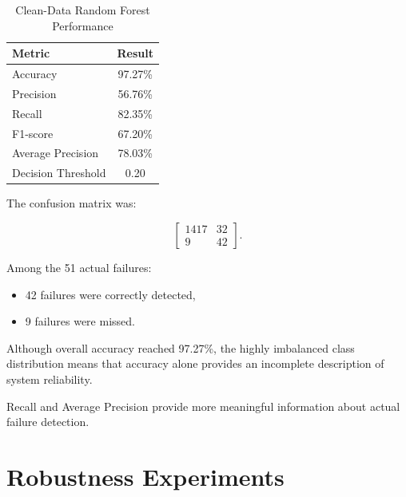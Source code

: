 \documentclass[conference]{IEEEtran}
\begin{document}
\begin{table}[htbp]

\caption{Clean-Data Random Forest Performance}

\label{tab:baseline}

\centering

\begin{tabular}{lc}

\toprule

\textbf{Metric} & \textbf{Result}\\

\midrule

Accuracy & 97.27\%\\
Precision & 56.76\%\\
Recall & 82.35\%\\
F1-score & 67.20\%\\
Average Precision & 78.03\%\\
Decision Threshold & 0.20\\

\bottomrule

\end{tabular}

\end{table}

The confusion matrix was:

\[
\begin{bmatrix}
1417 & 32\\
9 & 42
\end{bmatrix}.
\]

Among the 51 actual failures:

\begin{itemize}

    \item 42 failures were correctly detected,
    \item 9 failures were missed.

\end{itemize}

Although overall accuracy reached 97.27\%, the highly imbalanced class distribution means that accuracy alone provides an incomplete description of system reliability.

Recall and Average Precision provide more meaningful information about actual failure detection.


\section{Robustness Experiments}
\end{document}
